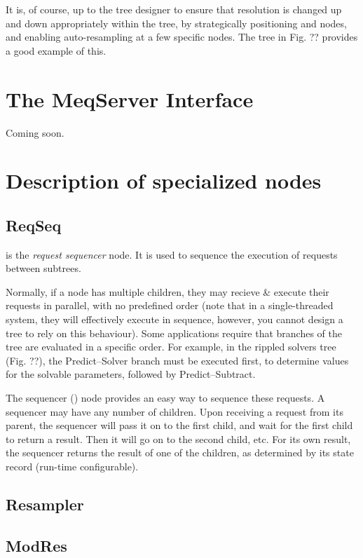  It is, of course, up to the tree designer to ensure that resolution is
  changed up and down appropriately within the tree, by strategically
  positioning  and  nodes, and enabling
  auto-resampling at a few specific nodes. The tree in Fig. ?? provides a good
  example of this.

\chapter{The MeqServer Interface}

Coming soon.

\chapter{Description of specialized nodes}

\section{ReqSeq}

   is the {\em request sequencer} node. It is used to sequence the
  execution of requests between subtrees.
  
  Normally, if a node has multiple children, they may recieve \& execute their
  requests in parallel, with no predefined order (note that in a
  single-threaded system, they will effectively execute in sequence, however,
  you cannot design a tree to rely on this behaviour). Some applications
  require that branches of the tree are evaluated in a specific order. For
  example, in the rippled solvers tree (Fig. ??), the Predict--Solver branch
  must be executed first, to determine values for the solvable parameters,
  followed by Predict--Subtract.
  
  The sequencer () node provides an easy way to sequence these
  requests. A sequencer may have any number of children. Upon receiving a
  request from its parent, the sequencer will pass it on to the first child,
  and wait for the first child to return a result. Then it will go on to the
  second child, etc. For its own result, the sequencer returns the result of
  one of the children, as determined by its state record (run-time
  configurable).

\section{Resampler}

\section{ModRes}

